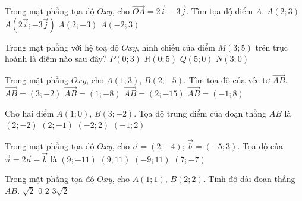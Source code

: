 \begin{ex}%
	Trong mặt phẳng tọa độ $Oxy$, cho $\overrightarrow{OA}=2\overrightarrow{i}-3\overrightarrow{j}$. Tìm tọa độ điểm $A$.
	\choice
	{$A(2;3) $}
	{$A\left(2\overrightarrow{i};-3\overrightarrow{j}\right) $}
	{\True $A(2;-3) $}
	{$A(-2;3) $}
\end{ex}

\begin{ex}%
	Trong mặt phẳng với hệ toạ độ $Oxy$, hình chiếu của điểm $M(3;5)$ trên trục hoành là điểm nào sau đây?
	\choice
	{$P(0;3)$}
	{$R(0;5)$}
	{$Q(5;0)$}
	{\True $N(3;0)$}
\end{ex}

\begin{ex}%
	Trong mặt phẳng $Oxy$, cho $A(1;3)$, $B(2;-5)$. Tìm tọa độ của véc-tơ $\overrightarrow{AB}$.
	\choice
	{$\overrightarrow{AB}=(3;-2)$}
	{\True $\overrightarrow{AB}=(1;-8)$}
	{$\overrightarrow{AB}=(2;-15)$}
	{$\overrightarrow{AB}=(-1;8)$}
\end{ex}

\begin{ex}%
	Cho hai điểm $A(1;0)$, $B(3;-2)$. Tọa độ trung điểm của đoạn thẳng $AB$ là
	\choice
	{$(2;-2)$}
	{\True $(2;-1)$}
	{$(-2;2)$}
	{$(-1;2)$}
\end{ex}

\begin{ex}%
	Trong mặt phẳng tọa độ $Oxy$, cho $\overrightarrow{a}=(2;-4)$; $\overrightarrow{b}=(-5;3)$. Tọa độ của $\overrightarrow{u}=2\overrightarrow{a}-\overrightarrow{b}$ là  
	\choice
	{\True $(9;-11)$}
	{$(9;11)$}
	{$(-9;11)$}
	{$(7;-7)$}
\end{ex}

\begin{ex}%
	Trong mặt phẳng tọa độ $Oxy$, cho $A(1;1)$, $B(2;2)$. Tính độ dài đoạn thẳng $AB$.
	\choice
	{\True $\sqrt{2}$}
	{$0$}
	{$2$}
	{$3\sqrt{2}$}
\end{ex}

